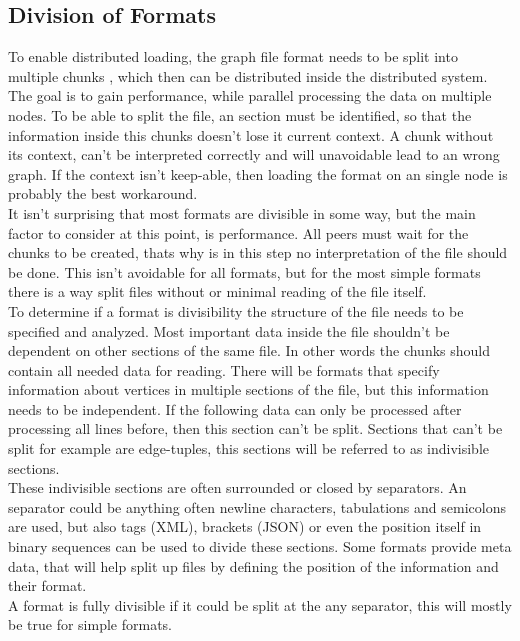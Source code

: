 \subsection{Division of Formats}
To enable distributed loading, the graph file format needs to be split into multiple chunks \cite{parallelGraphLoading}, which then can be distributed inside the distributed system. The goal is to gain performance, while parallel processing the data on multiple nodes. To be able to split the file, an section must be identified, so that the information inside this chunks doesn't lose it current context. A chunk without its context, can't be interpreted correctly and will unavoidable lead to an wrong graph. If the context isn't keep-able, then loading the format on an single node is probably the best workaround.\\
It isn't surprising that most formats are divisible in some way, but the main factor to consider at this point, is performance. All peers must wait for the chunks to be created, thats why is in this step no interpretation of the file should be done. This isn't avoidable for all formats, but for the most simple formats there is a way split files without or minimal reading of the file itself.\\
To determine if a format is divisibility the structure of the file needs to be specified and analyzed. Most important data inside the file shouldn't be dependent on other sections of the same file. In other words the chunks should contain all needed data for reading. 
There will be formats that specify information about vertices in multiple sections of the file, but this information needs to be independent. If the following data can only be processed after processing all lines before, then this section can't be split. Sections that can't be split for example are edge-tuples, this sections will be referred to as indivisible sections.\\
These indivisible sections are often surrounded or closed by separators. An separator could be anything often newline characters, tabulations and  semicolons are used, but also tags (XML), brackets (JSON) or even the position itself in binary sequences can be used to divide these sections. Some formats provide meta data, that will help split up files by defining the position of the information and their format.\\
A format is fully divisible if it could be split at the any separator, this will mostly be true for simple formats.

